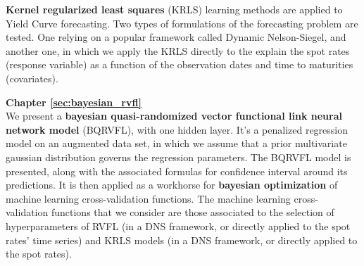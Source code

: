 \textbf{Kernel regularized least squares} (KRLS) learning methods are applied to Yield Curve forecasting. Two types of formulations of the forecasting problem are tested. One relying on a popular framework called Dynamic Nelson-Siegel, and another one, in which we apply the KRLS directly to the explain the spot rates (response variable) as a function of the observation dates and time to maturities (covariates).

\textbf{Chapter \ref{sec:bayesian_rvfl}} \\[0.2em]

We present a \textbf{bayesian quasi-randomized vector functional link neural network model} (BQRVFL), with one hidden layer. It's a penalized regression model on an augmented data set, in which we assume that a prior multivariate gaussian distribution governs the regression parameters. The BQRVFL model is presented, along with the associated formulas for confidence interval around its predictions. It is then applied as a workhorse for \textbf{bayesian optimization} of machine learning cross-validation functions. The machine learning cross-validation functions that we consider are those associated to the selection of hyperparameters of RVFL (in a DNS framework, or directly applied to the spot rates' time series) and KRLS models (in a DNS framework, or directly applied to the spot rates).

